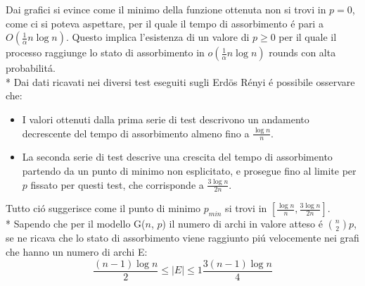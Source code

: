 \documentclass[../Tesi.tex]{subfiles}
\begin{document}
Dai grafici si evince come il minimo della funzione ottenuta non si trovi in $p=0$, come ci si poteva aspettare, per il quale il tempo di assorbimento \'e pari a $O(\frac{1}{\alpha}n\log{}n)$.
Questo implica l'esistenza di un valore di $p \geq 0$ per il quale il processo raggiunge lo stato di assorbimento in $o(\frac{1}{\alpha}n\log{}n)$ rounds con alta probabilit\'a.\\*
Dai dati ricavati nei diversi test eseguiti sugli Erd{\"o}s R\'enyi \'e possibile osservare che:
\begin{itemize}
    \item I valori ottenuti dalla prima serie di test descrivono un andamento decrescente del tempo di assorbimento almeno fino a $\frac{\log{n}}{n}$.
    \item La seconda serie di test descrive una crescita del tempo di assorbimento partendo da un punto di minimo non esplicitato, e prosegue fino al limite per $p$ fissato per questi test, che corrisponde a $\frac{3\log{n}}{2n}$.
\end{itemize}
Tutto ci\'o suggerisce come il punto di minimo $p_{min}$ si trovi in $[\frac{\log{n}}{n} , \frac{3\log{n}}{2n}]$.\\*
Sapendo che per il modello G($n$, $p$) il numero di archi in valore atteso \'e $\binom{n}{2}p$, se ne ricava che lo stato di assorbimento viene raggiunto pi\'u velocemente nei grafi che hanno un numero di archi E:
\begin{equation}
    \frac{(n-1)\log{n}}{2} \leq |E| \le1  \frac{3(n-1)\log{n}}{4}
\end{equation}
\end{document}

